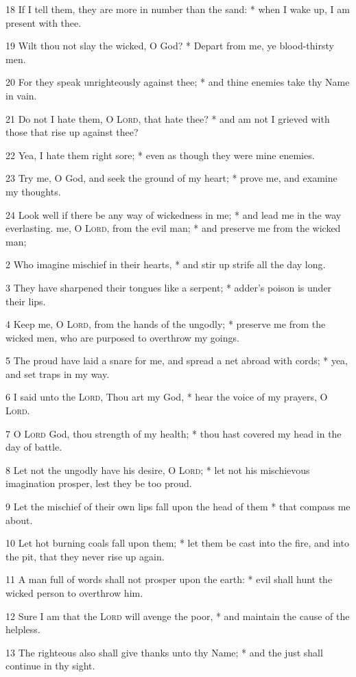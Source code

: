 18 If I tell them, they are more in number than the sand: * when I wake up, I am present with thee.\par
19 Wilt thou not slay the wicked, O God? * Depart from me, ye blood-thirsty men.\par
20 For they speak unrighteously against thee; * and thine enemies take thy Name in vain.\par
21 Do not I hate them, O {\textsc{Lord}}, that hate thee? * and am not I grieved with those that rise up against thee?\par
22 Yea, I hate them right sore; * even as though they were mine enemies.\par
23 Try me, O God, and seek the ground of my heart; * prove me, and examine my thoughts.\par
24 Look well if there be any way of wickedness in me; * and lead me in the way everlasting.
 me, O {\textsc{Lord}}, from the evil man; * and preserve me from the wicked man;\par
2 Who imagine mischief in their hearts, * and stir up strife all the day long.\par
3 They have sharpened their tongues like a serpent; * adder's poison is under their lips.\par
4 Keep me, O {\textsc{Lord}}, from the hands of the ungodly; * preserve me from the wicked men, who are purposed to overthrow my goings.\par
5 The proud have laid a snare for me, and spread a net abroad with cords; * yea, and set traps in my way.\par
6 I said unto the {\textsc{Lord}}, Thou art my God, * hear the voice of my prayers, O {\textsc{Lord}}.\par
7 O {\textsc{Lord}} God, thou strength of my health; * thou hast covered my head in the day of battle.\par
8 Let not the ungodly have his desire, O {\textsc{Lord}}; * let not his mischievous imagination prosper, lest they be too proud.\par
9 Let the mischief of their own lips fall upon the head of them * that compass me about.\par
10 Let hot burning coals fall upon them; * let them be cast into the fire, and into the pit, that they never rise up again.\par
11 A man full of words shall not prosper upon the earth: * evil shall hunt the wicked person to overthrow him.\par
12 Sure I am that the {\textsc{Lord}} will avenge the poor, * and maintain the cause of the helpless.\par
13 The righteous also shall give thanks unto thy Name; * and the just shall continue in thy sight.
